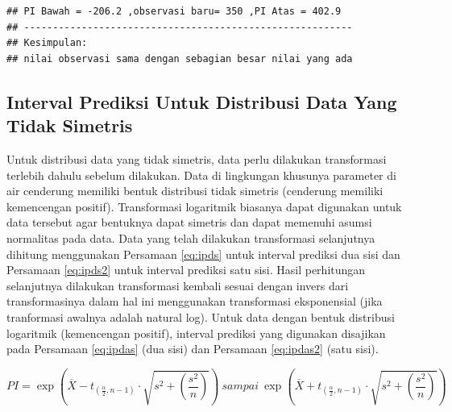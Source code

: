 \documentclass[]{book}
\newenvironment{Shaded}{\begin{snugshade}}{\end{snugshade}}
\newcommand{\KeywordTok}[1]{\textcolor[rgb]{0.13,0.29,0.53}{\textbf{#1}}}
\newcommand{\DataTypeTok}[1]{\textcolor[rgb]{0.13,0.29,0.53}{#1}}
\newcommand{\DecValTok}[1]{\textcolor[rgb]{0.00,0.00,0.81}{#1}}
\newcommand{\FloatTok}[1]{\textcolor[rgb]{0.00,0.00,0.81}{#1}}
\newcommand{\CommentTok}[1]{\textcolor[rgb]{0.56,0.35,0.01}{\textit{#1}}}
\newcommand{\OperatorTok}[1]{\textcolor[rgb]{0.81,0.36,0.00}{\textbf{#1}}}
\newcommand{\NormalTok}[1]{#1}
\begin{document}
\begin{Shaded}
\end{Shaded}

\begin{verbatim}
## PI Bawah = -206.2 ,observasi baru= 350 ,PI Atas = 402.9
## ---------------------------------------------------------
## Kesimpulan:
## nilai observasi sama dengan sebagian besar nilai yang ada
\end{verbatim}

\subsection{Interval Prediksi Untuk Distribusi Data Yang Tidak
Simetris}\label{interval-prediksi-untuk-distribusi-data-yang-tidak-simetris}

Untuk distribusi data yang tidak simetris, data perlu dilakukan
transformasi terlebih dahulu sebelum dilakukan. Data di lingkungan
khusunya parameter di air cenderung memiliki bentuk distribusi tidak
simetris (cenderung memiliki kemencengan positif). Transformasi
logaritmik biasanya dapat digunakan untuk data tersebut agar bentuknya
dapat simetris dan dapat memenuhi asumsi normalitas pada data. Data yang
telah dilakukan transformasi selanjutnya dihitung menggunakan Persamaan
\eqref{eq:ipds} untuk interval prediksi dua sisi dan Persamaan
\eqref{eq:ipds2} untuk interval prediksi satu sisi. Hasil perhitungan
selanjutnya dilakukan transformasi kembali sesuai dengan invers dari
transformasinya dalam hal ini menggunakan transformasi eksponensial
(jika tranformasi awalnya adalah natural log). Untuk data dengan bentuk
distribusi logaritmik (kemencengan positif), interval prediksi yang
digunakan disajikan pada Persamaan \eqref{eq:ipdas} (dua sisi) dan
Persamaan \eqref{eq:ipdas2} (satu sisi).

\begin{equation}
  PI=\exp\left(\overline{X}-t_{\left(\frac{\alpha}{2},n-1\right)}\cdot\sqrt{s^2+\left(\frac{s^2}{n}\right)}\right)\ sampai\ \exp\left(\overline{X}+t_{\left(\frac{\alpha}{2},n-1\right)}\cdot\sqrt{s^2+\left(\frac{s^2}{n}\right)}\right)
  \label{eq:ipdas}
\end{equation}
\end{document}
